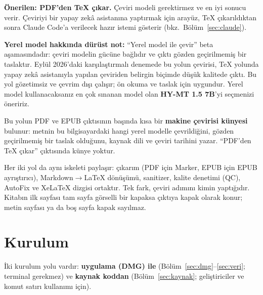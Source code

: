 \documentclass[11pt,a4paper]{article}
\begin{document}
\begin{notkutu}
\textbf{Önerilen: PDF'den TeX çıkar.} Çeviri modeli gerektirmez ve en iyi
sonucu verir. Çeviriyi bir yapay zekâ asistanına yaptırmak için arayüz, TeX
çıkarıldıktan sonra Claude Code'a verilecek hazır istemi gösterir
(bkz.\ Bölüm~\ref{sec:claude}).
\end{notkutu}

\begin{notkutu}
\textbf{Yerel model hakkında dürüst not:} ``Yerel model ile çevir'' beta
aşamasındadır: çeviri modelin gücüne bağlıdır ve çıktı gözden geçirilmemiş bir
taslaktır. Eylül 2026'daki karşılaştırmalı denemede bu yolun çevirisi, TeX
yolunda yapay zekâ asistanıyla yapılan çeviriden belirgin biçimde düşük
kalitede çıktı. Bu yol gözetimsiz ve çevrim dışı çalışır; ön okuma ve taslak
için uygundur. Yerel model kullanacaksanız en çok sınanan model olan
\textbf{HY-MT 1.5 7B}'yi seçmenizi öneririz.
\end{notkutu}

Bu yolun PDF ve EPUB çıktısının başında kısa bir \textbf{makine çevirisi
künyesi} bulunur: metnin bu bilgisayardaki hangi yerel modelle çevrildiğini,
gözden geçirilmemiş bir taslak olduğunu, kaynak dili ve çeviri tarihini yazar.
``PDF'den TeX çıkar'' çıktısında künye yoktur.

Her iki yol da aynı iskeleti paylaşır: çıkarım (PDF için Marker, EPUB için
EPUB ayrıştırıcı), Markdown\(\rightarrow\)LaTeX dönüşümü, sanitizer, kalite
denetimi (QC), AutoFix ve XeLaTeX dizgisi ortaktır. Tek fark, çeviri adımını
kimin yaptığıdır. Kitabın ilk sayfası tam sayfa görselli bir kapaksa çıktıya
kapak olarak konur; metin sayfası ya da boş sayfa kapak sayılmaz.

\section{Kurulum}

İki kurulum yolu vardır: \textbf{uygulama (DMG) ile} (Bölüm~\ref{sec:dmg}--\ref{sec:veri};
terminal gerekmez) ve \textbf{kaynak koddan} (Bölüm~\ref{sec:kaynak};
geliştiriciler ve komut satırı kullanımı için).
\end{document}

